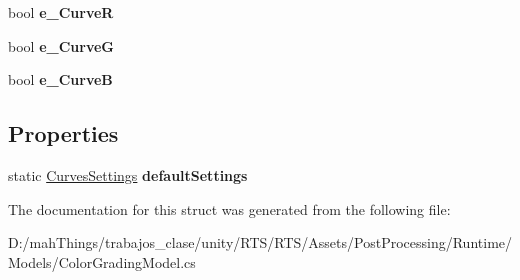 \begin{DoxyCompactItemize}
bool {\bfseries e\+\_\+\+CurveR}
\item 
\mbox{\label{struct_unity_engine_1_1_post_processing_1_1_color_grading_model_1_1_curves_settings_a941a7a74f9734e7dbac6b33abf449ffd}} 
bool {\bfseries e\+\_\+\+CurveG}
\item 
\mbox{\label{struct_unity_engine_1_1_post_processing_1_1_color_grading_model_1_1_curves_settings_a1987d533cb917c5ab0fcc82a89a8b86f}} 
bool {\bfseries e\+\_\+\+CurveB}
\end{DoxyCompactItemize}
\subsection*{Properties}
\begin{DoxyCompactItemize}
\item 
\mbox{\label{struct_unity_engine_1_1_post_processing_1_1_color_grading_model_1_1_curves_settings_a64d1e8f2e606f4d9cbd3fb89ace3c93d}} 
static \mbox{\hyperlink{struct_unity_engine_1_1_post_processing_1_1_color_grading_model_1_1_curves_settings}{Curves\+Settings}} {\bfseries default\+Settings}
\end{DoxyCompactItemize}


The documentation for this struct was generated from the following file\+:\begin{DoxyCompactItemize}
\item 
D\+:/mah\+Things/trabajos\+\_\+clase/unity/\+R\+T\+S/\+R\+T\+S/\+Assets/\+Post\+Processing/\+Runtime/\+Models/Color\+Grading\+Model.\+cs\end{DoxyCompactItemize}
